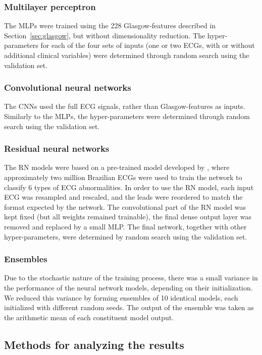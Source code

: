 \documentclass[preprint]{elsarticle}
\begin{document}
\subsubsection{Multilayer perceptron}
The MLPs were trained using the 228 Glasgow-features described in Section~\ref{sec:glasgow}, but without dimensionality reduction. The hyper-parameters for each of the four sets of inputs (one or two ECGs, with or without additional clinical variables) were determined through random search using the validation set.

\subsubsection{Convolutional neural networks}
The CNNs used the full ECG signals, rather than Glasgow-features as inputs. Similarly to the MLPs, the hyper-parameters were determined through random search using the validation set.

\subsubsection{Residual neural networks}
The RN models were based on a pre-trained model developed by \citet{ribeiro2020}, where approximately two million Brazilian ECGs were used to train the network to classify 6 types of ECG abnormalities. In order to use the RN model, each input ECG was resampled and rescaled, and the leads were reordered to match the format expected by the network. The convolutional part of the RN model was kept fixed (but all weights remained trainable), the final dense output layer was removed and replaced by a small MLP. The final network, together with other hyper-parameters, were determined by random search using the validation set. 

\subsubsection{Ensembles}
Due to the stochastic nature of the training process, there was a small variance in the performance of the neural network models, depending on their initialization. We reduced this variance by forming ensembles of 10 identical models, each initialized with different random seeds. The output of the ensemble was taken as the arithmetic mean of each constituent model output.

\subsection{Methods for analyzing the results}
\end{document}
